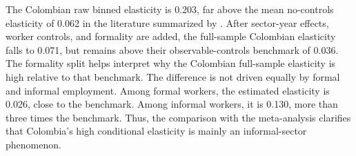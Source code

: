 

The Colombian raw binned elasticity is 0.203, far above the mean no-controls
elasticity of 0.062 in the literature summarized by
\citet{DiegmannMullerSchoefer2026}. After sector-year effects, worker controls,
and formality are added, the full-sample Colombian elasticity falls to 0.071,
but remains above their observable-controls benchmark of 0.036. The formality
split helps interpret why the Colombian full-sample elasticity is high relative
to that benchmark. The difference is not driven equally by formal and informal
employment. Among formal workers, the estimated elasticity is 0.026, close to
the benchmark. Among informal workers, it is 0.130, more than three times the
benchmark. Thus, the comparison with the meta-analysis clarifies that
Colombia's high conditional elasticity is mainly an informal-sector phenomenon.
